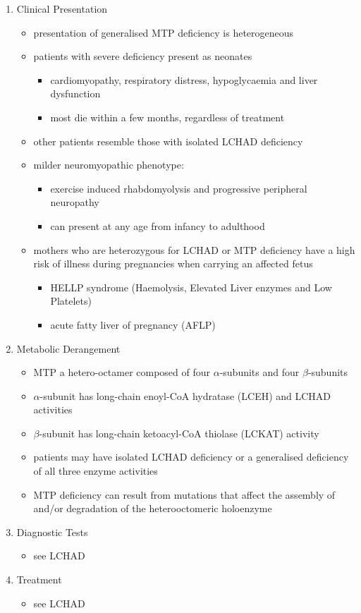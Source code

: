 \documentclass{scrartcl}
\begin{document}
\begin{enumerate}
\item Clinical Presentation
\label{sec:org8cf364b}
\begin{itemize}
\item presentation of generalised MTP deficiency is heterogeneous
\item patients with severe deficiency present as neonates
\begin{itemize}
\item cardiomyopathy, respiratory distress, hypoglycaemia and liver dysfunction
\item most die within a few months, regardless of treatment
\end{itemize}
\item other patients resemble those with isolated LCHAD deficiency
\item milder neuromyopathic phenotype:
\begin{itemize}
\item exercise induced rhabdomyolysis and progressive peripheral
neuropathy
\item can present at any age from infancy to adulthood
\end{itemize}
\item mothers who are heterozygous for LCHAD or MTP deficiency have a high
risk of illness during pregnancies when carrying an affected fetus
\begin{itemize}
\item HELLP syndrome (Haemolysis, Elevated Liver enzymes and Low Platelets)
\item acute fatty liver of pregnancy (AFLP)
\end{itemize}
\end{itemize}
\item Metabolic Derangement
\label{sec:org112df00}
\begin{itemize}
\item MTP a hetero-octamer composed of four \(\alpha\)-subunits and four
\(\beta\)-subunits
\item \(\alpha\)-subunit has long-chain enoyl-CoA hydratase (LCEH) and LCHAD
activities
\item \(\beta\)-subunit has long-chain ketoacyl-CoA thiolase (LCKAT) activity
\item patients may have isolated LCHAD deficiency or a generalised
deficiency of all three enzyme activities
\item MTP deficiency can result from mutations that affect the assembly of
and/or degradation of the heterooctomeric holoenzyme
\end{itemize}

\item Diagnostic Tests
\label{sec:org7db9615}
\begin{itemize}
\item see LCHAD
\end{itemize}

\item Treatment
\label{sec:orgad6b270}
\begin{itemize}
\item see LCHAD
\end{itemize}
\end{enumerate}
\end{document}
